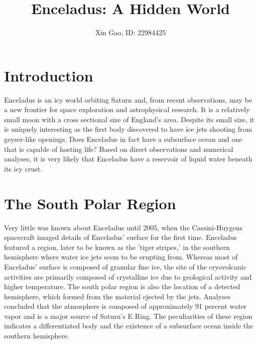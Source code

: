 \documentclass{article}
\author{Xin Gao, ID: 22984425}
\title{Enceladus: A Hidden World}
\begin{document}
\maketitle
\section{Introduction}
Enceladus is an icy world orbiting Saturn and, from recent observations,
may be a new frontier for space exploration and astrophysical
research. It is a relatively small moon with a cross sectional size of
England's area. Despite its small size, it is uniquely interesting as
the first body discovered to have ice jets shooting from geyser-like
openings. Does Enceladus in fact have a subsurface ocean and one that is
capable of hosting life? Based on direct observations and numerical
analyses, it is very likely that Enceladus have a reservoir of liquid
water beneath its icy crust.
\section{The South Polar Region}
Very little was known about Enceladus until 2005, when the
Cassini-Huygens spacecraft imaged details of Enceladus' surface for the
first time. Enceladus featured a region, later to be known as the 'tiger
stripes,' in the southern hemisphere where water ice jets seem to be
erupting from. Whereas most of Enceladus' surface is composed of
granular fine ice, the site of the cryovolcanic activities are primarily
composed of crystalline ice due to geological activity and higher
temperature. The south polar region is also the location of a detected
hemisphere, which formed from the material ejected by the jets. Analyses
concluded that the atmosphere is composed of approximately 91 percent
water vapor and is a major source of Saturn's E Ring. The peculiarities
of these region indicates a differentiated body and the existence of a
subsurface ocean inside the southern hemisphere. 
\end{document}
